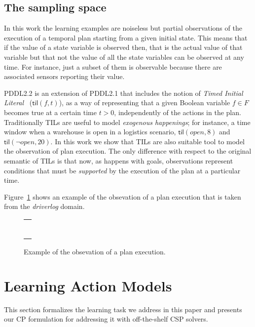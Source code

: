 \documentclass{ecai}
\newcommand{\til}{\mathsf{til}}    %
\begin{document}
\subsection{The sampling space}
\label{sec:sampling-space}
In this work the learning examples are noiseless but partial observations of the execution of a temporal plan starting from a given initial state. This means that if the value of a state variable is observed then, that is the actual value of that variable but that not the value of all the state variables can be observed at any time. For instance, just a subset of them is observable because there are associated sensors reporting their value.

PDDL2.2 is an extension of PDDL2.1 that includes the notion of {\em Timed Initial Literal}~\cite{hoffmann2005} ($\til(f,t)$), as a way of representing that a given Boolean variable $f\in F$ becomes true at a certain time $t>0$, independently of the actions in the plan. Traditionally TILs are useful to model {\em exogenous happenings}; for instance, a time window when a warehouse is open in a logistics scenario, $\til(open,8)$ and $\til(\neg open,20)$. In this work we show that TILs are also suitable tool to model the observation of plan execution. The only difference with respect to the original semantic of TILs is that now, as happens with goals, observations represent conditions that must be {\em supported} by the execution of the plan at a particular time.

Figure~\ref{fig:exampletils} shows an example of the obsevation of a plan execution that is taken from the {\em driverlog} domain.
\begin{figure}
  \begin{tabular}{p{\textwidth}}
\begin{tiny}    
\begin{verbatim}

\end{verbatim}
\end{tiny}    
\end{tabular}
\caption{\small Example of the obsevation of a plan execution.}
\label{fig:exampletils}
\end{figure}



\section{Learning Action Models}
This section formalizes the learning task we address in this paper and presents our CP formulation for addressing it with off-the-shelf CSP solvers.
\end{document}
